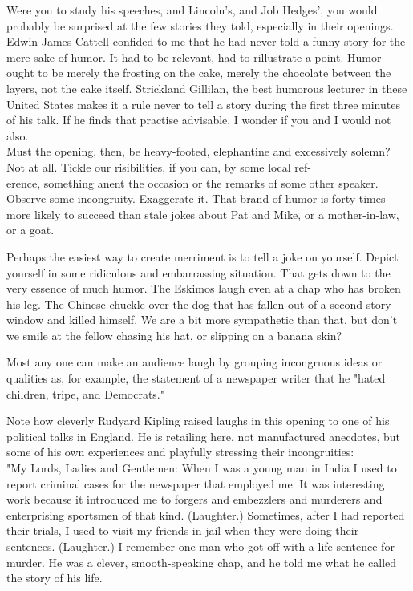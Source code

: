 \documentclass[10pt]{article}
\begin{document}
Were you to study his speeches, and Lincoln's, and Job Hedges', you would probably be surprised at the few stories they told, especially in their openings. Edwin James Cattell confided to me that he had never told a funny story for the mere sake of humor. It had to be relevant, had to rillustrate a point. Humor ought to be merely the frosting on the cake, merely the chocolate between the layers, not the cake itself. Strickland Gillilan, the best humorous lecturer in these United States makes it a rule never to tell a story during the first three minutes of his talk. If he finds that practise advisable, I wonder if you and I would not also.\\
Must the opening, then, be heavy-footed, elephantine and excessively solemn? Not at all. Tickle our risibilities, if you can, by some local ref-\\
erence, something anent the occasion or the remarks of some other speaker. Observe some incongruity. Exaggerate it. That brand of humor is forty times more likely to succeed than stale jokes about Pat and Mike, or a mother-in-law, or a goat.

Perhaps the easiest way to create merriment is to tell a joke on yourself. Depict yourself in some ridiculous and embarrassing situation. That gets down to the very essence of much humor. The Eskimos laugh even at a chap who has broken his leg. The Chinese chuckle over the dog that has fallen out of a second story window and killed himself. We are a bit more sympathetic than that, but don't we smile at the fellow chasing his hat, or slipping on a banana skin?

Most any one can make an audience laugh by grouping incongruous ideas or qualities as, for example, the statement of a newspaper writer that he "hated children, tripe, and Democrats."

Note how cleverly Rudyard Kipling raised laughs in this opening to one of his political talks in England. He is retailing here, not manufactured anecdotes, but some of his own experiences and playfully stressing their incongruities:\\
"My Lords, Ladies and Gentlemen: When I was a young man in India I used to report criminal cases for the newspaper that employed me. It was interesting work because it introduced me to forgers and embezzlers and murderers and enterprising sportsmen of that kind. (Laughter.) Sometimes, after I had reported their trials, I used to visit my friends in jail when they were doing their sentences. (Laughter.) I remember one man who got off with a life sentence for murder. He was a clever, smooth-speaking chap, and he told me what he called the story of his life.
\end{document}
